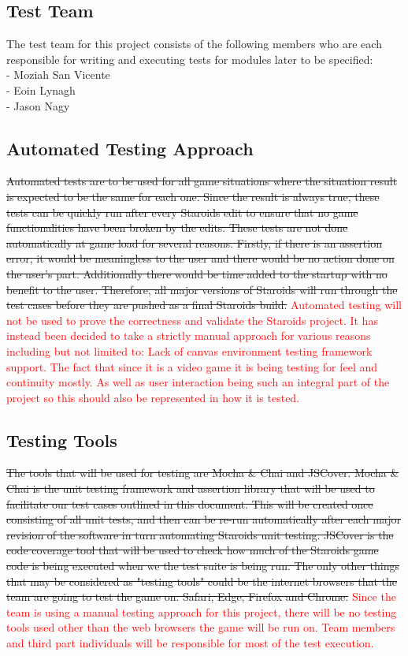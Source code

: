 \documentclass[12pt, titlepage]{article}
\begin{document}
\subsection{Test Team}
The test team for this project consists of the following members who are each responsible for writing and executing tests for modules later to be specified:\\
- Moziah San Vicente\\
- Eoin Lynagh\\
- Jason Nagy\\

\subsection{Automated Testing Approach}
\sout{Automated tests are to be used for all game situations where the situation result is expected to be the same for each one. Since the result is always true, these tests can be quickly run after every Staroids edit to ensure that no game functionalities have been broken by the edits. These tests are not done automatically at game load for several reasons. Firstly, if there is an assertion error, it would be meaningless to the user and there would be no action done on the user's part. Additionally there would be time added to the startup with no benefit to the user. Therefore, all major versions of Staroids will run through the test cases before they are pushed as a final Staroids build.}
\textcolor{red}{Automated testing will not be used to prove the correctness and validate the Staroids project. It has instead been decided to take a strictly manual approach for various reasons including but not limited to: Lack of canvas environment testing framework support. The fact that since it is a video game it is being testing for feel and continuity mostly. As well as user interaction being such an integral part of the project so this should also be represented in how it is tested.}

\subsection{Testing Tools}
\sout{The tools that will be used for testing are Mocha \& Chai and JSCover. Mocha \& Chai is the unit testing framework and assertion library that will be used to facilitate our test cases outlined in this document. This will be created once consisting of all unit tests, and then can be re-run automatically after each major revision of the software in turn automating Staroids unit testing. JSCover is the code coverage tool that will be used to check how much of the Staroids game code is being executed when we the test suite is being run. The only other things that may be considered as "testing tools" could be the internet browsers that the team are going to test the game on: Safari, Edge, Firefox and Chrome.}
\textcolor{red}{Since the team is using a manual testing approach for this project, there will be no testing tools used other than the web browsers the game will be run on. Team members and third part individuals will be responsible for most of the test execution.}
\end{document}
